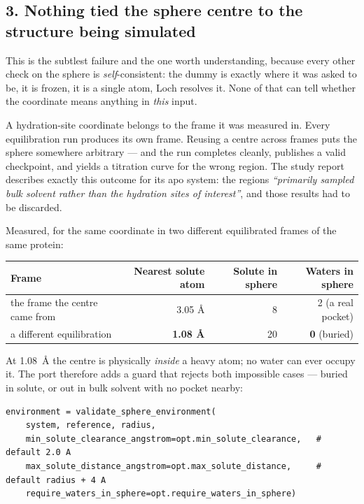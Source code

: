\documentclass[11pt]{article}
\begin{document}
\subsection*{3. Nothing tied the sphere centre to the structure being simulated}

This is the subtlest failure and the one worth understanding, because every other check on
the sphere is \emph{self}-consistent: the dummy is exactly where it was asked to be, it is
frozen, it is a single atom, Loch resolves it. None of that can tell whether the coordinate
means anything in \emph{this} input.

A hydration-site coordinate belongs to the frame it was measured in. Every equilibration run
produces its own frame. Reusing a centre across frames puts the sphere somewhere arbitrary
--- and the run completes cleanly, publishes a valid checkpoint, and yields a titration curve
for the wrong region. The study report describes exactly this outcome for its apo system:
the regions \emph{``primarily sampled bulk solvent rather than the hydration sites of
interest''}, and those results had to be discarded.

Measured, for the same coordinate in two different equilibrated frames of the same protein:

\begin{center}\small
\begin{tabular}{@{}l r r r@{}}
\toprule
Frame & Nearest solute atom & Solute in sphere & Waters in sphere \\
\midrule
the frame the centre came from & 3.05 \AA{} & 8 & 2 (a real pocket) \\
a different equilibration & \textbf{1.08 \AA{}} & 20 & \textbf{0} (buried) \\
\bottomrule
\end{tabular}
\end{center}

At 1.08~\AA{} the centre is physically \emph{inside} a heavy atom; no water can ever occupy
it. The port therefore adds a guard that rejects both impossible cases --- buried in solute,
or out in bulk solvent with no pocket nearby:

\begin{lstlisting}
environment = validate_sphere_environment(
    system, reference, radius,
    min_solute_clearance_angstrom=opt.min_solute_clearance,   # default 2.0 A
    max_solute_distance_angstrom=opt.max_solute_distance,     # default radius + 4 A
    require_waters_in_sphere=opt.require_waters_in_sphere)
\end{lstlisting}
\end{document}
